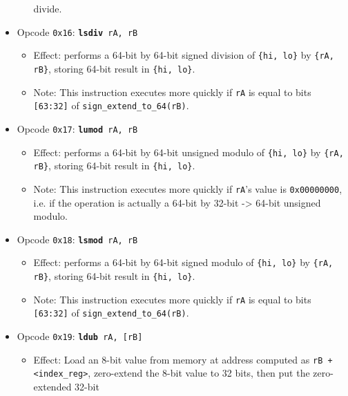 \documentclass{article}
\begin{document}
\begin{itemize}
\begin{itemize}
		divide.
		\end{itemize}
	\item Opcode \texttt{0x16}:
		\texttt{\textbf{lsdiv} rA, rB}
		\begin{itemize}
		\item Effect: performs a 64-bit by 64-bit signed division of
		\texttt{\{hi, lo\}} by \texttt{\{rA, rB\}}, storing 64-bit
		result in \texttt{\{hi, lo\}}.
		\item Note: This instruction executes more quickly if
		\texttt{rA} is equal to bits \texttt{[63:32]} of
		\texttt{sign\_extend\_to\_64(rB)}.
		\end{itemize}
	\item Opcode \texttt{0x17}:
		\texttt{\textbf{lumod} rA, rB}
		\begin{itemize}
		\item Effect: performs a 64-bit by 64-bit unsigned modulo of
		\texttt{\{hi, lo\}} by \texttt{\{rA, rB\}}, storing 64-bit
		result in \texttt{\{hi, lo\}}.
		\item Note: This instruction executes more quickly if
		\texttt{rA}'s value is \texttt{0x00000000}, i.e. if the
		operation is actually a 64-bit by 32-bit -> 64-bit unsigned
		modulo.
		\end{itemize}
	\item Opcode \texttt{0x18}:
		\texttt{\textbf{lsmod} rA, rB}
		\begin{itemize}
		\item Effect: performs a 64-bit by 64-bit signed modulo of
		\texttt{\{hi, lo\}} by \texttt{\{rA, rB\}}, storing 64-bit
		result in \texttt{\{hi, lo\}}.
		\item Note: This instruction executes more quickly if
		\texttt{rA} is equal to bits \texttt{[63:32]} of
		\texttt{sign\_extend\_to\_64(rB)}.
		\end{itemize}
	\item Opcode \texttt{0x19}:
		\texttt{\textbf{ldub} rA, [rB]}
		\begin{itemize}
		\item Effect: Load an 8-bit value from memory at address
		computed as \texttt{rB + <index\_reg>}, zero-extend
		the 8-bit value to 32 bits, then put the zero-extended 32-bit

\end{itemize}
\end{itemize}
\end{document}
